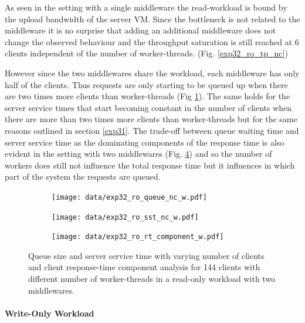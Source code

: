 \documentclass[report.tex]{subfiles}
\begin{document}
As seen in the setting with a single middleware the read-workload is bound by the upload bandwidth of the server VM. Since the bottleneck is not related to the middleware it is no surprise that adding an additional middleware does not change the observed behaviour and the throughput saturation is still reached at 6 clients independent of the number of worker-threads. (Fig. \ref{exp32_ro_tp_nc})

However since the two middlewares share the workload, each middleware has only half of the clients.
Thus requests are only starting to be queued up when there are two times more clients than worker-threads (Fig \ref{exp32_ro_q}).
The same holds for the server service times that start becoming constant in the number of clients when there are more than two times more clients than worker-threads but for the same reasons outlined in section \ref{exp31}. 
The trade-off between queue waiting time and server service time as the dominating components of the response time is also evident in the setting with two middlewares (Fig. \ref{exp32_ro_rtcomp}) and so the number of workers does still not influence the total response time but it influences in which part of the system the requests are queued.



\begin{figure}
	\begin{subfigure}[b]{.33\linewidth}
		\centering
		\texttt{[image: data/exp32\_ro\_queue\_nc\_w.pdf]}
		\caption{}\label{exp32_ro_q}
	\end{subfigure}\hfill
	\begin{subfigure}[b]{.33\linewidth}
		\centering
		\texttt{[image: data/exp32\_ro\_sst\_nc\_w.pdf]}
		\caption{}\label{exp32_ro_sst}
	\end{subfigure}\hfill
	\begin{subfigure}[b]{.33\linewidth}
		\centering
		\texttt{[image: data/exp32\_ro\_rt\_component\_w.pdf]}
		\caption{}\label{exp32_ro_rtcomp}
	\end{subfigure}
	\caption{Queue size and server service time with varying number of clients and client response-time component analysis for 144 clients with different number of worker-threads in a read-only workload with two middlewares.}
\end{figure}

\paragraph{Write-Only Workload}
\end{document}
